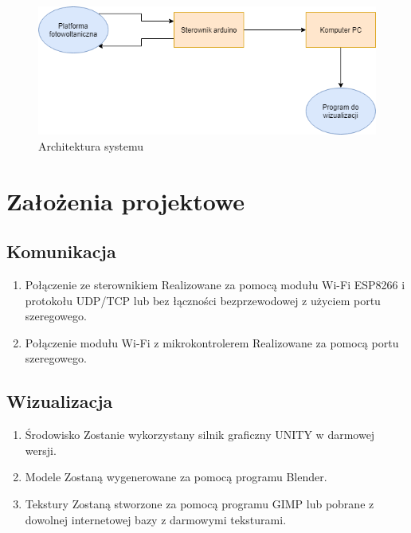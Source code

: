 \documentclass[10pt, a4paper]{article}
\begin{document}
\begin{figure}[H]
	\centering
	\includegraphics[width=1\textwidth]{figures/diag_uml.png}
	\caption{Architektura systemu}
	\label{fig:Architektura}
\end{figure}

\section{Założenia projektowe}

	\subsection{Komunikacja}
	\begin{enumerate}
		\item Połączenie ze sterownikiem
		\newline
		Realizowane za pomocą modułu Wi-Fi ESP8266 i protokołu UDP/TCP lub bez łączności bezprzewodowej z użyciem portu szeregowego.
		\item Połączenie modułu Wi-Fi z mikrokontrolerem
		\newline
		Realizowane za pomocą portu szeregowego.
	\end{enumerate}

	\subsection{Wizualizacja}
	\begin{enumerate}
		\item Środowisko
		\newline
		Zostanie wykorzystany silnik graficzny UNITY w darmowej wersji.
		\item Modele
		\newline
		Zostaną wygenerowane za pomocą programu Blender.
		\item Tekstury
		\newline
		Zostaną stworzone za pomocą programu GIMP lub pobrane z dowolnej internetowej bazy z darmowymi teksturami.
	\end{enumerate}
\end{document}

